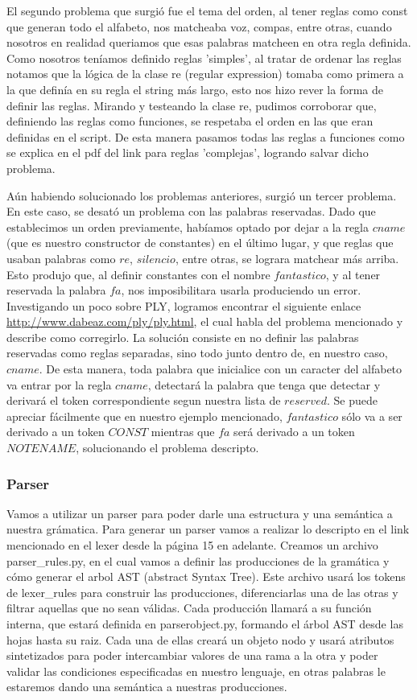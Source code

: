 El segundo problema que surgió fue el tema del orden, al tener reglas como const que generan todo el alfabeto, nos matcheaba voz, compas, entre otras, cuando nosotros en realidad queriamos que esas palabras matcheen en otra regla definida. Como nosotros teníamos definido reglas 'simples', al tratar de ordenar las reglas notamos que la lógica de la clase re (regular expression) tomaba como primera a la que definía en su regla el string más largo, esto nos hizo rever la forma de definir las reglas. Mirando y testeando la clase re, pudimos corroborar que, definiendo las reglas como funciones, se respetaba el orden en las que eran definidas en el script. De esta manera pasamos todas las reglas a funciones como se explica en el pdf del link para reglas 'complejas', logrando salvar dicho problema.\newline

Aún habiendo solucionado los problemas anteriores, surgió un tercer problema. En este caso, se desató un problema con las palabras reservadas. Dado que establecimos un orden previamente, habíamos optado por dejar a la regla $cname$ (que es nuestro constructor de constantes) en el último lugar, y que reglas que usaban palabras como $re$, $silencio$, entre otras, se lograra matchear más arriba. Esto produjo que, al definir constantes con el nombre $fantastico$, y al tener reservada la palabra $fa$, nos imposibilitara usarla produciendo un error. Investigando un poco sobre PLY, logramos encontrar el siguiente enlace \url{http://www.dabeaz.com/ply/ply.html}, el cual habla del problema mencionado y describe como corregirlo. La solución consiste en no definir las palabras reservadas como reglas separadas, sino todo junto dentro de, en nuestro caso, $cname$. De esta manera, toda palabra que inicialice con un caracter del alfabeto va entrar por la regla $cname$, detectará la palabra que tenga que detectar y derivará el token correspondiente segun nuestra lista de $reserved$. Se puede apreciar fácilmente que en nuestro ejemplo mencionado, $fantastico$ sólo va a ser derivado a un token $CONST$ mientras que $fa$ será derivado a un token $NOTENAME$, solucionando el problema descripto.

\subsubsection{Parser}
Vamos a utilizar un parser para poder darle una estructura y una semántica a nuestra grámatica.
Para generar un parser vamos a realizar lo descripto en el link mencionado en el lexer desde la página 15 en adelante. Creamos un archivo parser\_rules.py, en el cual vamos a definir las producciones de la gramática y cómo generar el arbol AST (abstract Syntax Tree). Este archivo usará los tokens de lexer\_rules para construir las producciones, diferenciarlas una de las otras y filtrar aquellas que no sean válidas.\newline
Cada producción llamará a su función interna, que estará definida en parserobject.py, formando el árbol AST desde las hojas hasta su raiz. Cada una de ellas creará un objeto nodo y usará atributos sintetizados para poder intercambiar valores de una rama a la otra y poder validar las condiciones especificadas en nuestro lenguaje, en otras palabras le estaremos dando una semántica a nuestras producciones.